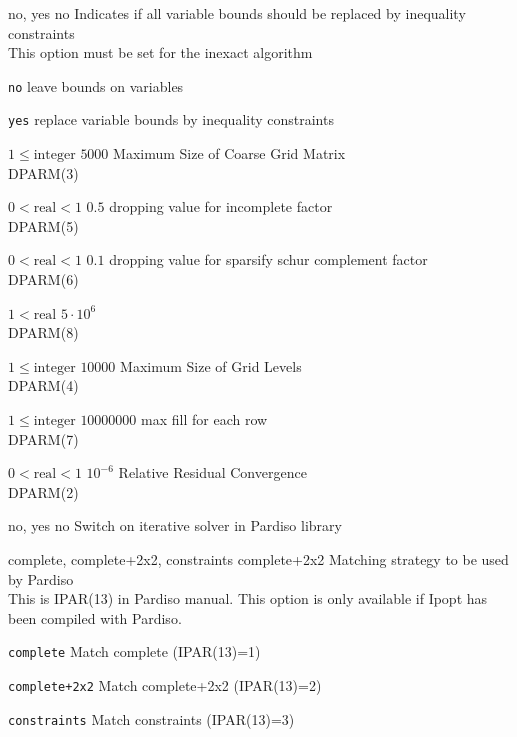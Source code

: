 %
{\ttfamily no, yes}%
{no}%
{Indicates if all variable bounds should be replaced by inequality constraints\\
This option must be set for the inexact algorithm}%
{\begin{list}{}{
\setlength{\parsep}{0em}
\setlength{\leftmargin}{5ex}
\setlength{\labelwidth}{2ex}
\setlength{\itemindent}{0ex}
\setlength{\topsep}{0pt}}
\item[\texttt{no}] leave bounds on variables
\item[\texttt{yes}] replace variable bounds by inequality constraints
\end{list}
}

%
{$1\leq\textrm{integer}$}%
{$5000$}%
{Maximum Size of Coarse Grid Matrix\\
DPARM(3)}%
{}

%
{$0<\textrm{real}<1$}%
{$0.5$}%
{dropping value for incomplete factor\\
DPARM(5)}%
{}

%
{$0<\textrm{real}<1$}%
{$0.1$}%
{dropping value for sparsify schur complement factor\\
DPARM(6)}%
{}

%
{$1<\textrm{real}$}%
{$5 \cdot 10^{  6}$}%
{\\
DPARM(8)}%
{}

%
{$1\leq\textrm{integer}$}%
{$10000$}%
{Maximum Size of Grid Levels\\
DPARM(4)}%
{}

%
{$1\leq\textrm{integer}$}%
{$10000000$}%
{max fill for each row\\
DPARM(7)}%
{}

%
{$0<\textrm{real}<1$}%
{$10^{- 6}$}%
{Relative Residual Convergence\\
DPARM(2)}%
{}

%
{\ttfamily no, yes}%
{no}%
{Switch on iterative solver in Pardiso library}%
{}

%
{\ttfamily complete, complete+2x2, constraints}%
{complete+2x2}%
{Matching strategy to be used by Pardiso\\
This is IPAR(13) in Pardiso manual.  This option is only available if Ipopt has been compiled with Pardiso.}%
{\begin{list}{}{
\setlength{\parsep}{0em}
\setlength{\leftmargin}{5ex}
\setlength{\labelwidth}{2ex}
\setlength{\itemindent}{0ex}
\setlength{\topsep}{0pt}}
\item[\texttt{complete}] Match complete (IPAR(13)=1)
\item[\texttt{complete+2x2}] Match complete+2x2 (IPAR(13)=2)
\item[\texttt{constraints}] Match constraints (IPAR(13)=3)
\end{list}
}


